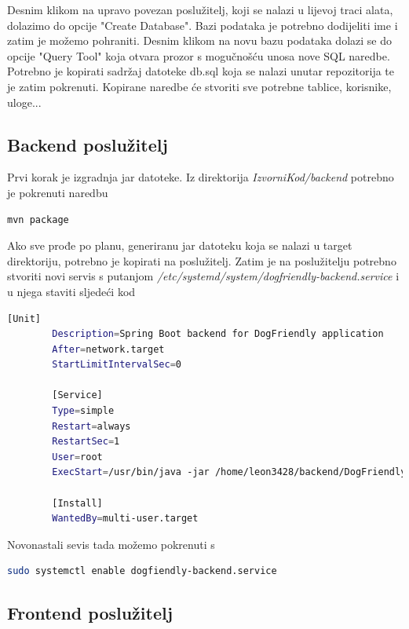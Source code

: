     Desnim klikom na upravo povezan poslužitelj, koji se nalazi u lijevoj traci alata, dolazimo do opcije "Create Database". Bazi podataka je potrebno dodijeliti ime i zatim je možemo pohraniti.
    Desnim klikom na novu bazu podataka dolazi se do opcije "Query Tool" koja otvara prozor s mogučnošću unosa nove SQL naredbe. Potrebno je kopirati sadržaj datoteke db.sql koja se nalazi unutar repozitorija te je zatim pokrenuti. Kopirane naredbe će stvoriti sve potrebne tablice, korisnike, uloge...

    \subsection{Backend poslužitelj}

    Prvi korak je izgradnja jar datoteke. Iz direktorija \textit{IzvorniKod/backend} potrebno je pokrenuti naredbu
    \begin{lstlisting}[language=bash]
      mvn package
    \end{lstlisting}
    Ako sve prođe po planu, generiranu jar datoteku koja se nalazi u target direktoriju, potrebno je kopirati na poslužitelj.
    Zatim je na poslužitelju potrebno stvoriti novi servis s putanjom \textit{/etc/systemd/system/dogfriendly-backend.service} i u njega staviti sljedeći kod
    \begin{lstlisting}[language=bash]
        [Unit]
        Description=Spring Boot backend for DogFriendly application
        After=network.target
        StartLimitIntervalSec=0
        
        [Service]
        Type=simple
        Restart=always
        RestartSec=1
        User=root
        ExecStart=/usr/bin/java -jar /home/leon3428/backend/DogFriendly-0.0.1-SNAPSHOT.jar
        
        [Install] 
        WantedBy=multi-user.target
    \end{lstlisting}
    
    Novonastali sevis tada možemo pokrenuti s
    \begin{lstlisting}[language=bash]
        sudo systemctl enable dogfiendly-backend.service
    \end{lstlisting}

    \eject
    \subsection{Frontend poslužitelj}

